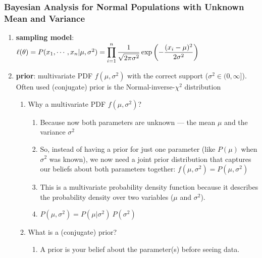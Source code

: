 \subsubsection{Bayesian Analysis for Normal Populations with Unknown Mean and Variance}

\begin{enumerate}
    \item \textbf{sampling model}: 
    $
        \ell(\theta) 
        = P(x_1, \cdots , x_ n |\mu, \sigma^2)
        = \displaystyle\prod^n _{i=1} \dfrac{1 }{\sqrt{2\pi\sigma^2}} \exp \left(-\dfrac{(x_i -\mu)^2} {2\sigma^2}\right)
    $
    \hfill \cite{statistics/book/Statistics-for-Data-Scientists/Maurits-Kaptein}

    \item \textbf{prior}: multivariate PDF $f (\mu, \sigma^2)$ with the correct support ($\sigma^2 \in (0, \infty]$).
    Often used (conjugate) prior is the Normal-inverse-$\chi^2$ distribution
    \hfill \cite{statistics/book/Statistics-for-Data-Scientists/Maurits-Kaptein}
    \begin{enumerate}
        \item Why a multivariate PDF $f(\mu,\sigma^2)$?
        \hfill \cite{common/online/chatgpt}
        \begin{enumerate}
            \item Because now both parameters are unknown — the mean $\mu$ and the variance $\sigma^2$
            \hfill \cite{common/online/chatgpt}

            \item So, instead of having a prior for just one parameter (like $P(\mu)$ when $\sigma^2$ was known), we now need a joint prior distribution that captures our beliefs about both parameters together: $f(\mu,\sigma^2)=P(\mu,\sigma^2)$
            \hfill \cite{common/online/chatgpt}

            \item This is a multivariate probability density function because it describes the probability density over two variables ($\mu$ and $\sigma^2$).
            \hfill \cite{common/online/chatgpt}

            \item $P(\mu,\sigma^2)=P(\mu|\sigma^2)\ P(\sigma^2)$
            \hfill \cite{common/online/chatgpt}
        \end{enumerate}

        \item What is a (conjugate) prior?
        \hfill \cite{common/online/chatgpt}
        \begin{enumerate}
            \item A prior is your belief about the parameter(s) before seeing data.
            \hfill \cite{common/online/chatgpt}


\end{enumerate}
\end{enumerate}
\end{enumerate}
